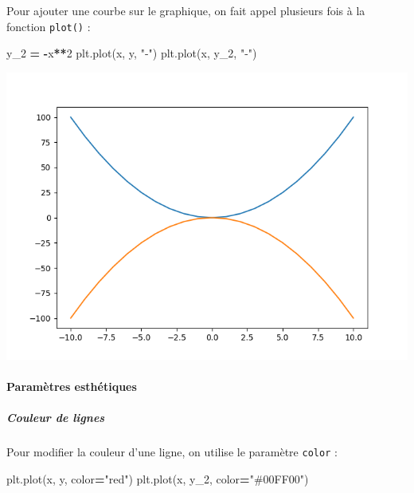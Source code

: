 \documentclass[
  12pt,
]{book}
\newenvironment{Shaded}{\begin{snugshade}}{\end{snugshade}}
\newcommand{\DecValTok}[1]{\textcolor[rgb]{0.00,0.00,0.81}{#1}}
\newcommand{\NormalTok}[1]{#1}
\newcommand{\OperatorTok}[1]{\textcolor[rgb]{0.81,0.36,0.00}{\textbf{#1}}}
\newcommand{\StringTok}[1]{\textcolor[rgb]{0.31,0.60,0.02}{#1}}
\numberwithin{equation}{section}
\numberwithin{countremarque}{section}
\begin{document}
Pour ajouter une courbe sur le graphique, on fait appel plusieurs fois à la fonction \texttt{plot()} :

\begin{Shaded}
\begin{Highlighting}[]
\NormalTok{y\_2 }\OperatorTok{=} \OperatorTok{{-}}\NormalTok{x}\OperatorTok{**}\DecValTok{2}
\NormalTok{plt.plot(x, y, }\StringTok{"{-}"}\NormalTok{)}
\NormalTok{plt.plot(x, y\_2, }\StringTok{"{-}"}\NormalTok{)}
\end{Highlighting}
\end{Shaded}

\begin{center}\includegraphics[width=9.03in]{figs/pyplot/lignes_2_courbes} \end{center}

\paragraph{Paramètres esthétiques}\label{paramuxe8tres-esthuxe9tiques}

\subparagraph{Couleur de lignes}\label{couleur-de-lignes}

Pour modifier la couleur d'une ligne, on utilise le paramètre \texttt{color} :

\begin{Shaded}
\begin{Highlighting}[]
\NormalTok{plt.plot(x, y, color}\OperatorTok{=}\StringTok{"red"}\NormalTok{)}
\NormalTok{plt.plot(x, y\_2, color}\OperatorTok{=}\StringTok{"\#00FF00"}\NormalTok{)}
\end{Highlighting}
\end{Shaded}
\end{document}
